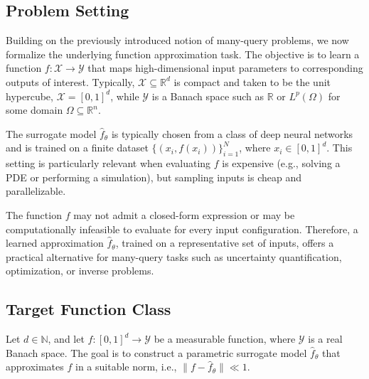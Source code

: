 \subsection{Problem Setting}
\label{subsec:problem-setting}

Building on the previously introduced notion of many-query problems, we now formalize the underlying function approximation task. The objective is to learn a function \( f \colon \mathcal{X} \rightarrow \mathcal{Y} \) that maps high-dimensional input parameters to corresponding outputs of interest. Typically, \( \mathcal{X} \subseteq \mathbb{R}^d \) is compact and taken to be the unit hypercube, \( \mathcal{X} = [0,1]^d \), while \( \mathcal{Y} \) is a Banach space such as \( \mathbb{R} \) or \( L^p(\Omega) \) for some domain \( \Omega \subseteq \mathbb{R}^n \).

The surrogate model \( \hat{f}_\theta \) is typically chosen from a class of deep neural networks and is trained on a finite dataset \( \{ (x_i, f(x_i)) \}_{i=1}^N \), where \( x_i \in [0,1]^d \). This setting is particularly relevant when evaluating \( f \) is expensive (e.g., solving a PDE or performing a simulation), but sampling inputs is cheap and parallelizable.

\begin{remark}
The function \( f \) may not admit a closed-form expression or may be computationally infeasible to evaluate for every input configuration. Therefore, a learned approximation \( \hat{f}_\theta \), trained on a representative set of inputs, offers a practical alternative for many-query tasks such as uncertainty quantification, optimization, or inverse problems.
\end{remark}

\subsection{Target Function Class}
\label{subsec:function-class}

\begin{definition}
Let \( d \in \mathbb{N} \), and let \( f \colon [0,1]^d \rightarrow \mathcal{Y} \) be a measurable function, where \( \mathcal{Y} \) is a real Banach space. The goal is to construct a parametric surrogate model \( \hat{f}_\theta \) that approximates \( f \) in a suitable norm, i.e., \( \| f - \hat{f}_\theta \| \ll 1 \).
\end{definition}

